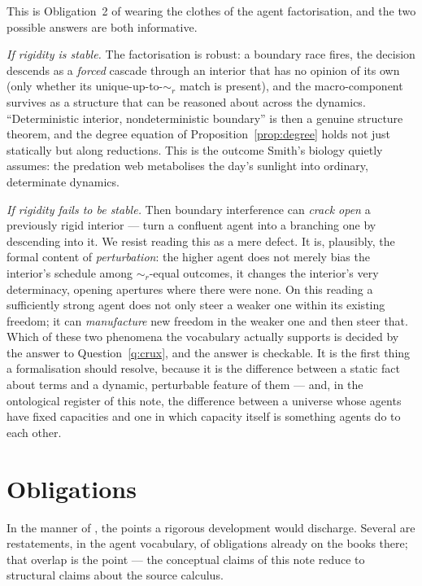 \documentclass[11pt]{article}
\theoremstyle{definition}
\theoremstyle{plain}
\theoremstyle{remark}
\newcommand{\rbisim}{\sim_{r}}
\begin{document}
\noindent
This is Obligation~2 of \cite{paths} wearing the clothes of the agent
factorisation, and the two possible answers are both informative.

\emph{If rigidity is stable.} The factorisation is robust: a boundary race fires,
the decision descends as a \emph{forced} cascade through an interior that has no
opinion of its own (only whether its unique-up-to-$\rbisim$ match is present), and
the macro-component survives as a structure that can be reasoned about across the
dynamics. ``Deterministic interior, nondeterministic boundary'' is then a genuine
structure theorem, and the degree equation of Proposition~\ref{prop:degree} holds
not just statically but along reductions. This is the outcome Smith's biology
quietly assumes: the predation web metabolises the day's sunlight into ordinary,
determinate dynamics.

\emph{If rigidity fails to be stable.} Then boundary interference can \emph{crack
open} a previously rigid interior --- turn a confluent agent into a branching one
by descending into it. We resist reading this as a mere defect. It is, plausibly,
the formal content of \emph{perturbation}: the higher agent does not merely bias the
interior's schedule among $\rbisim$-equal outcomes, it changes the interior's very
determinacy, opening apertures where there were none. On this reading a sufficiently
strong agent does not only steer a weaker one within its existing freedom; it can
\emph{manufacture} new freedom in the weaker one and then steer that. Which of these
two phenomena the vocabulary actually supports is decided by the answer to
Question~\ref{q:crux}, and the answer is checkable. It is the first thing a
formalisation should resolve, because it is the difference between a static fact
about terms and a dynamic, perturbable feature of them --- and, in the ontological
register of this note, the difference between a universe whose agents have fixed
capacities and one in which capacity itself is something agents do to each other.

\section{Obligations}

In the manner of \cite{qcs,paths}, the points a rigorous development would
discharge. Several are restatements, in the agent vocabulary, of obligations
already on the books there; that overlap is the point --- the conceptual claims of
this note reduce to structural claims about the source calculus.
\end{document}
